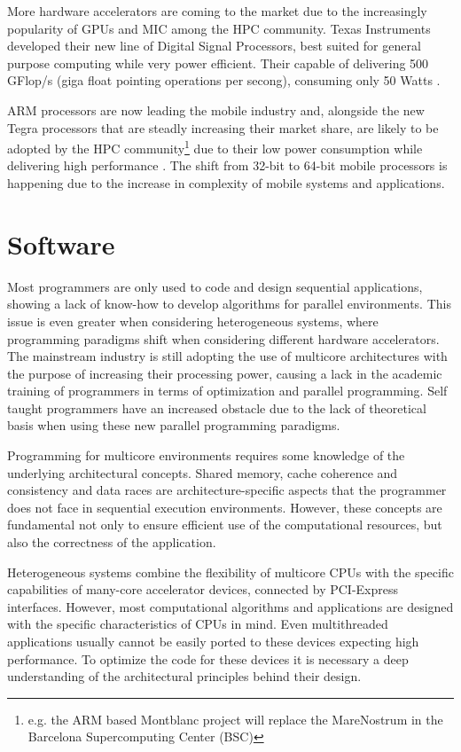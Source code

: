 More hardware accelerators are coming to the market due to the increasingly popularity of GPUs and \intel MIC among the HPC community. Texas Instruments developed their new line of Digital Signal Processors, best suited for general purpose computing while very power efficient. Their capable of delivering 500 GFlop/s (giga float pointing operations per secong), consuming only 50 Watts \cite{Texas:DSP}.

ARM processors are now leading the mobile industry and, alongside the new \nvidia Tegra processors \cite{NVIDIA:Tegra} that are steadly increasing their market share, are likely to be adopted by the HPC community\footnote{e.g. the ARM based Montblanc project will replace the MareNostrum in the Barcelona Supercomputing Center (BSC)} due to their low power consumption while delivering high performance \cite{ARM}. The shift from 32-bit to 64-bit mobile processors is happening due to the increase in complexity of mobile systems and applications.

\section{Software}
\label{Software}

Most programmers are only used to code and design sequential applications, showing a lack of know-how to develop algorithms for parallel environments. This issue is even greater when considering heterogeneous systems, where programming paradigms shift when considering different hardware accelerators. The mainstream industry is still adopting the use of multicore architectures with the purpose of increasing their processing power, causing a lack in the academic training of programmers in terms of optimization and parallel programming. Self taught programmers have an increased obstacle due to the lack of theoretical basis when using these new parallel programming paradigms.

Programming for multicore environments requires some knowledge of the underlying architectural concepts. Shared memory, cache coherence and consistency and data races are architecture-specific aspects that the programmer does not face in sequential execution environments. However, these concepts are fundamental not only to ensure efficient use of the computational resources, but also the correctness of the application.

Heterogeneous systems combine the flexibility of multicore CPUs with the specific capabilities of many-core accelerator devices, connected by PCI-Express interfaces. However, most computational algorithms and applications are designed with the specific characteristics of CPUs in mind. Even multithreaded applications usually cannot be easily ported to these devices expecting high performance. To optimize the code for these devices it is necessary a deep understanding of the architectural principles behind their design.

